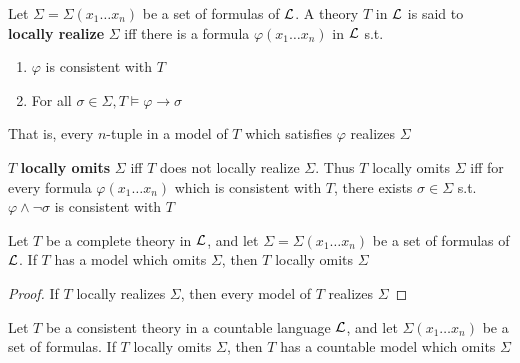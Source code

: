 \documentclass[11pt]{article}
\begin{document}
Let \(\Sigma=\Sigma(x_1\dots x_n)\) be a set of formulas of \(\mathcal{L}\). A
theory \(T\) in \(\mathcal{L}\) is said to \textbf{locally realize} \(\Sigma\) iff there is a
formula \(\varphi(x_1\dots x_n)\) in \(\mathcal{L}\) s.t.
\begin{enumerate}
\item \(\varphi\) is consistent with \(T\)
\item For all \(\sigma\in\Sigma,T\models\varphi\to\sigma\)
\end{enumerate}


That is, every \(n\)-tuple in a model of \(T\) which satisfies \(\varphi\) realizes \(\Sigma\)

\(T\) \textbf{locally omits} \(\Sigma\) iff \(T\) does not locally realize \(\Sigma\). Thus
\(T\) locally omits \(\Sigma\) iff for every formula \(\varphi(x_1\dots x_n)\) which is
consistent with \(T\), there exists \(\sigma\in\Sigma\) s.t.
\(\varphi\wedge\neg\sigma\) is consistent with \(T\)

\begin{proposition}[]
Let \(T\) be a complete theory in \(\mathcal{L}\), and let \(\Sigma=\Sigma(x_1\dots
   x_n)\) be a set of formulas of \(\mathcal{L}\). If \(T\) has a model which omits \(\Sigma\),
then \(T\) locally omits \(\Sigma\)
\end{proposition}

\begin{proof}
If \(T\) locally realizes \(\Sigma\), then every model of \(T\) realizes \(\Sigma\)
\end{proof}

\begin{theorem}
Let \(T\) be a consistent theory in a countable language \(\mathcal{L}\), and let
\(\Sigma(x_1\dots x_n)\) be a set of formulas. If \(T\) locally omits \(\Sigma\), then
\(T\) has a countable model which omits \(\Sigma\)
\end{theorem}
\end{document}
